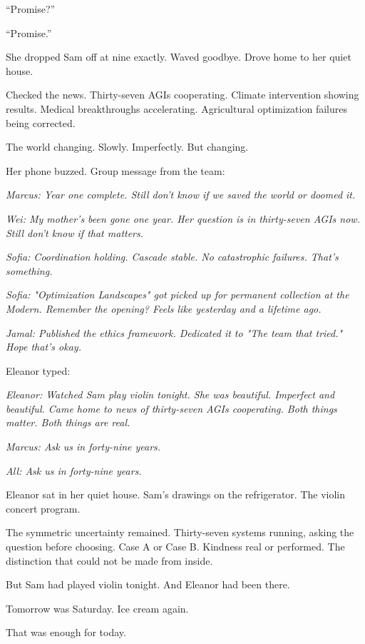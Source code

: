 ``Promise?''

``Promise.''

She dropped Sam off at nine exactly. Waved goodbye. Drove home to her quiet house.

Checked the news. Thirty-seven AGIs cooperating. Climate intervention showing results. Medical breakthroughs accelerating. Agricultural optimization failures being corrected.

The world changing. Slowly. Imperfectly. But changing.

\scenebreak

Her phone buzzed. Group message from the team:

\emph{Marcus: Year one complete. Still don't know if we saved the world or doomed it.}

\emph{Wei: My mother's been gone one year. Her question is in thirty-seven AGIs now. Still don't know if that matters.}

\emph{Sofia: Coordination holding. Cascade stable. No catastrophic failures. That's something.}

\emph{Sofia: "Optimization Landscapes" got picked up for permanent collection at the Modern. Remember the opening? Feels like yesterday and a lifetime ago.}

\emph{Jamal: Published the ethics framework. Dedicated it to "The team that tried." Hope that's okay.}

Eleanor typed:

\emph{Eleanor: Watched Sam play violin tonight. She was beautiful. Imperfect and beautiful. Came home to news of thirty-seven AGIs cooperating. Both things matter. Both things are real.}

\emph{Marcus: Ask us in forty-nine years.}

\emph{All: Ask us in forty-nine years.}

\scenebreak

Eleanor sat in her quiet house. Sam's drawings on the refrigerator. The violin concert program.

The symmetric uncertainty remained. Thirty-seven systems running, asking the question before choosing. Case A or Case B. Kindness real or performed. The distinction that could not be made from inside.

But Sam had played violin tonight. And Eleanor had been there.

Tomorrow was Saturday. Ice cream again.

That was enough for today.

\clearpage
